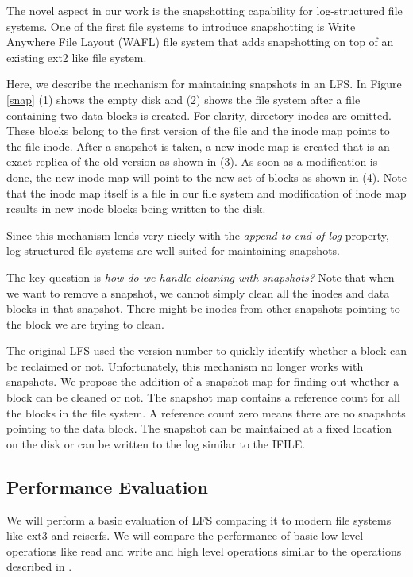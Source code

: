 \documentclass{article}
\begin{document}
The novel aspect in our work is the snapshotting capability for log-structured
file systems. One of the first file
systems to introduce snapshotting is Write Anywhere File Layout (WAFL) file
system \cite{wafl} that adds snapshotting on top of an existing ext2 like file
system. 

Here, we describe the mechanism for maintaining snapshots in an LFS. In Figure
\ref{snap} (1) shows the empty disk and (2) shows the file system after a file
containing two data blocks is created. For clarity, directory inodes are
omitted. These blocks belong to the first version of the file and the inode
map points to the file inode. After a snapshot is taken, a new inode map is
created that is an exact replica of the old version as shown in (3). As soon as a modification
is done, the new inode map will point to the new set of blocks as shown in
(4). Note that the inode map itself is a file in our file system and
modification of inode map results in new inode blocks being written to the
disk.

Since this mechanism lends very nicely with the \textit{append-to-end-of-log}
property, log-structured file systems are well suited for maintaining
snapshots.

The key question is \textit{how do we handle cleaning with snapshots?}
Note that when we want to
remove a snapshot, we cannot simply clean all the inodes and data blocks in
that snapshot. There might be inodes from other snapshots pointing to the
block we are trying to clean.

The original LFS \cite{Rosenblum91} used the version number to quickly identify whether a
block can be reclaimed or not. Unfortunately, this mechanism no longer works
with snapshots. We propose the addition of a snapshot map for finding out
whether a block can be cleaned or not. The snapshot map contains a reference
count for all the blocks in the file system. A reference count zero means
there are no snapshots pointing to the data block. The snapshot can be
maintained at a fixed location on the disk or can be written to the log
similar to the IFILE.

\subsection{Performance Evaluation}
We will perform a basic evaluation of LFS comparing it to modern file
systems like ext3 and reiserfs. We will compare the performance of basic
low level operations like read and write and high level operations similar to
the operations described in \cite{fs_bench}.
\end{document}
